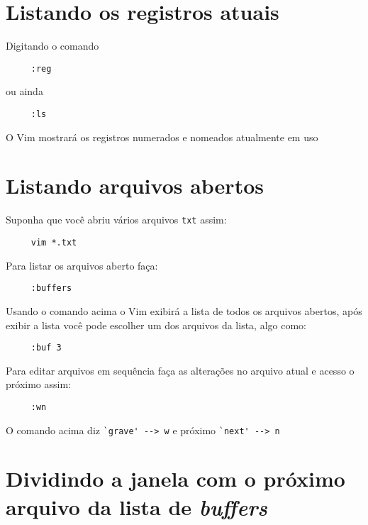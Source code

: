 \section{Listando os registros atuais}
\label{Listando os registros atuais}
Digitando o comando

\begin{verbatim}
     :reg
\end{verbatim}

ou ainda

\begin{verbatim}
     :ls
\end{verbatim}

O Vim mostrará os registros numerados e nomeados atualmente em uso

\section{Listando arquivos abertos}
\label{Listando arquivos abertos}
Suponha que você abriu vários arquivos {\tt txt} assim:

\begin{verbatim}
     vim *.txt
\end{verbatim}

Para listar os arquivos aberto faça:

\begin{verbatim}
     :buffers
\end{verbatim}

Usando o comando acima o Vim exibirá a lista de todos os arquivos
abertos, após exibir a lista você pode escolher um dos arquivos da
lista, algo como:

\begin{verbatim}
     :buf 3
\end{verbatim}

Para editar arquivos em sequência faça as alterações no arquivo atual
e acesso o próximo assim:

\begin{verbatim}
     :wn
\end{verbatim}

O comando acima diz \verb|`grave' --> w|  e próximo \verb|`next' --> n|

\section{Dividindo a janela com o próximo arquivo da lista de {\em buffers}}
\label{Dividindo a janela com o próximo arquivo da lista de buffers}

